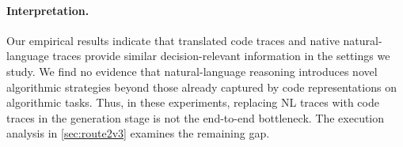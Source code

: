 \paragraph{Interpretation.} Our empirical results indicate that translated code traces and native natural-language traces provide similar decision-relevant information in the settings we study. We find no evidence that natural-language reasoning introduces novel algorithmic strategies beyond those already captured by code representations on algorithmic tasks. Thus, in these experiments, replacing NL traces with code traces in the generation stage is not the end-to-end bottleneck. The execution analysis in \cref{sec:route2v3} examines the remaining gap.



